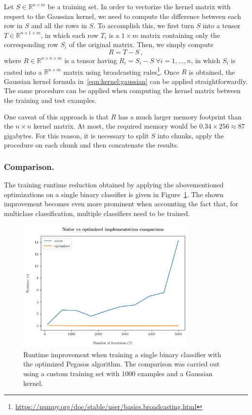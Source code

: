 \documentclass[runningheads]{llncs}
\begin{document}
Let $S \in \mathbb{R}^{n \times m}$ be a training set. In order to vectorize the kernel matrix with respect to the Gaussian kernel, we need to compute the difference between each row in $S$ and all the rows in $S$. To accomplish this, we first turn $S$ into a tensor $T \in \mathbb{R}^{n \times 1 \times m}$, in which each row $T_i$ is a $1 \times m$ matrix containing only the corresponding row $S_i$ of the original matrix. Then, we simply compute
\[
  R = T - S \, ,
\]
where $R \in \mathbb{R}^{n \times n \times m}$ is a tensor having $R_i = S_i - S \; \forall i=1,\dots,n$, in which $S_i$ is casted into a $\mathbb{R}^{n \times m}$ matrix using broadcasting rules\footnote{\url{https://numpy.org/doc/stable/user/basics.broadcasting.html}}. Once $R$ is obtained, the Gaussian kernel formula in~\ref{eqn:kernel:gaussian} can be applied straightforwardly. The same procedure can be applied when computing the kernel matrix between the training and test examples.

One caveat of this approach is that $R$ has a much larger memory footprint than the $n \times n$ kernel matrix. At most, the required memory would be $0.34 \times 256 \approx 87$ gigabytes. For this reason, it is necessary to split $S$ into chunks, apply the procedure on each chunk and then concatenate the results.

\subsubsection{Comparison.} The training runtime reduction obtained by applying the abovementioned optimizations on a single binary classifier is given in Figure~\ref{fig:algorithm:runtime}. The shown improvement becomes even more prominent when accounting the fact that, for multiclass classification, multiple classifiers need to be trained.

\begin{figure}
  \center
  \includegraphics[width=0.8\textwidth]{../img/runtime.png}
  \caption{Runtime improvement when training a single binary classifier with the optimized Pegasos algorithm. The comparison was carried out using a custom training set with 1000 examples and a Gaussian kernel.} 
  \label{fig:algorithm:runtime}
\end{figure}
\end{document}
